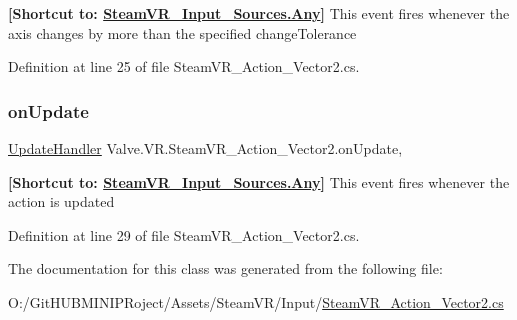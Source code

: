 {\bfseries{\mbox{[}Shortcut to\+: \mbox{\hyperlink{namespace_valve_1_1_v_r_a82e5bf501cc3aa155444ee3f0662853faed36a1ef76a59ee3f15180e0441188ad}{Steam\+V\+R\+\_\+\+Input\+\_\+\+Sources.\+Any}}\mbox{]}}} This event fires whenever the axis changes by more than the specified change\+Tolerance 



Definition at line 25 of file Steam\+V\+R\+\_\+\+Action\+\_\+\+Vector2.\+cs.

\mbox{\label{class_valve_1_1_v_r_1_1_steam_v_r___action___vector2_a26a550d86f7daabe09bc123e2ce7bd77}} 
\subsubsection{\texorpdfstring{onUpdate}{onUpdate}}
{\footnotesize\ttfamily \mbox{\hyperlink{class_valve_1_1_v_r_1_1_steam_v_r___action___vector2_a3f6872fd8960cbb9f571b0362857d9b5}{Update\+Handler}} Valve.\+V\+R.\+Steam\+V\+R\+\_\+\+Action\+\_\+\+Vector2.\+on\+Update\hspace{0.3cm}{\ttfamily [add]}, {\ttfamily [remove]}}



{\bfseries{\mbox{[}Shortcut to\+: \mbox{\hyperlink{namespace_valve_1_1_v_r_a82e5bf501cc3aa155444ee3f0662853faed36a1ef76a59ee3f15180e0441188ad}{Steam\+V\+R\+\_\+\+Input\+\_\+\+Sources.\+Any}}\mbox{]}}} This event fires whenever the action is updated 



Definition at line 29 of file Steam\+V\+R\+\_\+\+Action\+\_\+\+Vector2.\+cs.



The documentation for this class was generated from the following file\+:\begin{DoxyCompactItemize}
\item 
O\+:/\+Git\+H\+U\+B\+M\+I\+N\+I\+P\+Roject/\+Assets/\+Steam\+V\+R/\+Input/\mbox{\hyperlink{_steam_v_r___action___vector2_8cs}{Steam\+V\+R\+\_\+\+Action\+\_\+\+Vector2.\+cs}}\end{DoxyCompactItemize}
